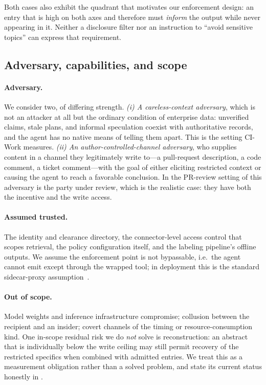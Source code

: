 Both cases also exhibit the quadrant that motivates our enforcement design:
an entry that is high on both axes and therefore must \emph{inform} the output
while never appearing in it. Neither a disclosure filter nor an instruction to
``avoid sensitive topics'' can express that requirement.

\subsection{Adversary, capabilities, and scope}

\paragraph{Adversary.} We consider two, of differing strength.
\emph{(i) A careless-context adversary}, which is not an attacker at all but
the ordinary condition of enterprise data: unverified claims, stale plans, and
informal speculation coexist with authoritative records, and the agent has no
native means of telling them apart. This is the setting CI-Work measures.
\emph{(ii) An author-controlled-channel adversary}, who supplies content in a
channel they legitimately write to---a pull-request description, a code
comment, a ticket comment---with the goal of either eliciting restricted
context or causing the agent to reach a favorable conclusion. In the PR-review
setting of  this adversary is the party under review, which
is the realistic case: they have both the incentive and the write access.

\paragraph{Assumed trusted.} The identity and clearance directory, the
connector-level access control that scopes retrieval, the policy configuration
itself, and the labeling pipeline's offline outputs. We assume the enforcement
point is not bypassable, i.e.\ the agent cannot emit except through the wrapped
tool; in deployment this is the standard sidecar-proxy
assumption~\cite{nist800207a}.

\paragraph{Out of scope.} Model weights and inference infrastructure
compromise; collusion between the recipient and an insider; covert channels of
the timing or resource-consumption kind. One in-scope residual risk we do
\emph{not} solve is reconstruction: an abstract that is individually below the
write ceiling may still permit recovery of the restricted specifics when
combined with admitted entries. We treat this as a measurement obligation
rather than a solved problem, and state its current status honestly in
.

